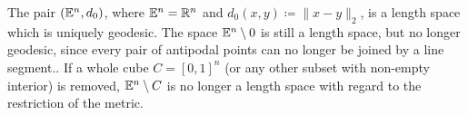 
\begin{bsp}
  The pair \((\mathbb{E}^n, d_0)\), where \(\mathbb{E}^n = \mathbb{R}^n\) and \(d_0(x,y) \coloneqq \|x - y\|_2\), is a length space which is uniquely geodesic. The space \(\mathbb{E}^n \setminus {0}\) is still a length space, but no longer geodesic, since every pair of antipodal points can no longer be joined by a line segment.. If a whole cube \(C= [0,1]^n\) (or any other subset with non-empty interior) is removed, \(\mathbb{E}^n \setminus C\) is no longer a length space with regard to the restriction of the  metric. 
\end{bsp}


